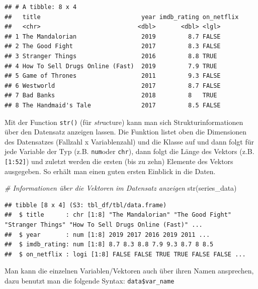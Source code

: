 \documentclass[
]{book}
\newenvironment{Shaded}{\begin{snugshade}}{\end{snugshade}}
\newcommand{\CommentTok}[1]{\textcolor[rgb]{0.56,0.35,0.01}{\textit{#1}}}
\newcommand{\FunctionTok}[1]{\textcolor[rgb]{0.00,0.00,0.00}{#1}}
\newcommand{\NormalTok}[1]{#1}
\newcommand{\SpecialCharTok}[1]{\textcolor[rgb]{0.00,0.00,0.00}{#1}}
\begin{document}
\begin{verbatim}
## # A tibble: 8 x 4
##   title                            year imdb_rating on_netflix
##   <chr>                           <dbl>       <dbl> <lgl>     
## 1 The Mandalorian                  2019         8.7 FALSE     
## 2 The Good Fight                   2017         8.3 FALSE     
## 3 Stranger Things                  2016         8.8 TRUE      
## 4 How To Sell Drugs Online (Fast)  2019         7.9 TRUE      
## 5 Game of Thrones                  2011         9.3 FALSE     
## 6 Westworld                        2017         8.7 FALSE     
## 7 Bad Banks                        2018         8   TRUE      
## 8 The Handmaid's Tale              2017         8.5 FALSE
\end{verbatim}

Mit der Function \texttt{str()} (für \emph{str}ucture) kann man sich Strukturinformationen über den Datensatz anzeigen lassen. Die Funktion listet oben die Dimensionen des Datensatzes (Fallzahl x Variablenzahl) und die Klasse auf und dann folgt für jede Variable der Typ (z.B. \texttt{num}oder \texttt{chr}), dann folgt die Länge des Vektors (z.B. \texttt{{[}1:52{]}}) und zuletzt werden die ersten (bis zu zehn) Elemente des Vektors ausgegeben. So erhält man einen guten ersten Einblick in die Daten.

\begin{Shaded}
\begin{Highlighting}[]
\CommentTok{\# Informationen über die Vektoren im Datensatz anzeigen}
\FunctionTok{str}\NormalTok{(series\_data)}
\end{Highlighting}
\end{Shaded}

\begin{verbatim}
## tibble [8 x 4] (S3: tbl_df/tbl/data.frame)
##  $ title      : chr [1:8] "The Mandalorian" "The Good Fight" "Stranger Things" "How To Sell Drugs Online (Fast)" ...
##  $ year       : num [1:8] 2019 2017 2016 2019 2011 ...
##  $ imdb_rating: num [1:8] 8.7 8.3 8.8 7.9 9.3 8.7 8 8.5
##  $ on_netflix : logi [1:8] FALSE FALSE TRUE TRUE FALSE FALSE ...
\end{verbatim}

Man kann die einzelnen Variablen/Vektoren auch über ihren Namen ansprechen, dazu benutzt man die folgende Syntax: \texttt{data\$var\_name}

\begin{Shaded}
\end{Shaded}
\end{document}
